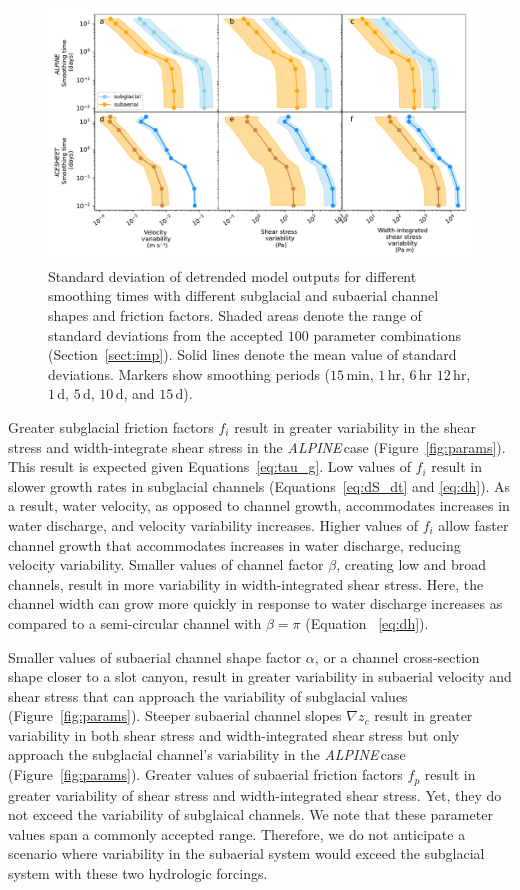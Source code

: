 \documentclass[tc, manuscript]{copernicus}
\newcommand{\alpine}{\textit{ALPINE}\,}
\begin{document}
\begin{figure}[hbt!]
  \centering
  \includegraphics[width=0.7\linewidth]{Fig4.pdf}
  \caption{Standard deviation of detrended model outputs for different smoothing times with different subglacial and subaerial channel shapes and friction factors.
    Shaded areas denote the range of standard deviations from the accepted $100$ parameter combinations (Section~\ref{sect:imp}).
    Solid lines denote the mean value of standard deviations.
    Markers show smoothing periods ($15$\,\unit{min}, $1$\,\unit{hr}, $6$\,\unit{hr} $12$\,\unit{hr}, $1$\,\unit{d}, $5$\,\unit{d}, $10$\,\unit{d}, and $15$\,\unit{d}).
  }
  \label{fig:multi_run}
\end{figure}

Greater subglacial friction factors $f_i$ result in greater variability in the shear stress and width-integrate shear stress in the \alpine case (Figure~\ref{fig:params}).
This result is expected given Equations~\ref{eq:tau_g}.
Low values of $f_i$ result in slower growth rates in subglacial channels (Equations~\ref{eq:dS_dt} and \ref{eq:dh}).
As a result, water velocity, as opposed to channel growth, accommodates increases in water discharge, and velocity variability increases.
Higher values of $f_i$ allow faster channel growth that accommodates increases in water discharge, reducing velocity variability.
Smaller values of channel factor $\beta$, creating low and broad channels, result in more variability in width-integrated shear stress.
Here, the channel width can grow more quickly in response to water discharge increases as compared to a semi-circular channel with $\beta = \pi$ (Equation~ \ref{eq:dh}).

Smaller values of subaerial channel shape factor $\alpha$, or a  channel cross-section shape closer to a slot canyon, result in greater variability in subaerial velocity and shear stress that can approach the variability of subglacial values (Figure~\ref{fig:params}).
Steeper subaerial channel slopes $\nabla z_c$ result in greater variability in both shear stress and width-integrated shear stress but only approach the subglacial channel's variability in the \alpine case (Figure~\ref{fig:params}). 
Greater values of subaerial friction factors $f_p$ result in greater variability of shear stress and width-integrated shear stress. 
Yet, they do not exceed the variability of subglaical channels. 
We note that these parameter values span a commonly accepted range.
Therefore, we do not anticipate a scenario where variability in the subaerial system would exceed the subglacial system with these two hydrologic forcings.
\end{document}
